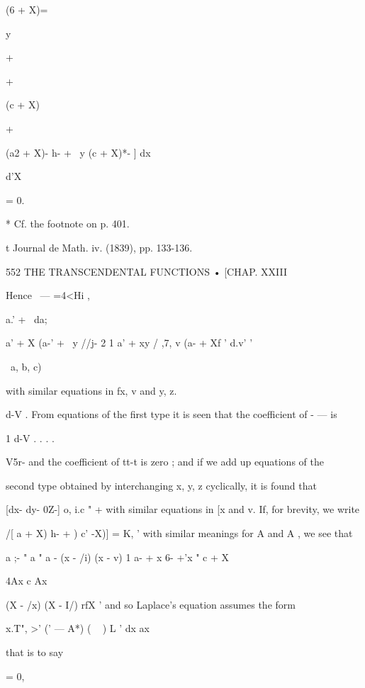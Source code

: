 {{{(6 + X)=

y



+



+



(c + X)



+



(a2 + X)- h- + \ y (c + X)*- ] dx



d'X



= 0.



* Cf. the footnote on p. 401.

t Journal de Math. iv. (1839), pp. 133-136.



552 THE TRANSCENDENTAL FUNCTIONS • [CHAP. XXIII

Hence ~— =4<Hi ,

a.' + \ da;

a' + X (a-' + \ y //j- 2 1 a' + xy / ,7, v (a- + Xf ' d.v' '

\ a, b, c)

with similar equations in fx, v and y, z.

d-V . From equations of the first type it is seen that the coefficient
of - — is

1 d-V . . . .

V5r- and the coefficient of tt-t is zero ; and if we add up equations
of the

second type obtained by interchanging x, y, z cyclically, it is found
that

[dx- dy- 0Z-] o, i.c " + with similar equations in [x and v. If, for
brevity, we write

 /[ a + X) h- + ) c' -X)] = K, ' with similar meanings for A and A ,
we see that

a ;- " a " a - (x - /i) (x - v) 1 a- + x 6- +'x " c + X

4Ax c Ax



(X - /x) (X - I/) rfX ' and so Laplace's equation assumes the form

x.T", >' (' — A*) ( ~ ) L ' dx ax

that is to say



= 0,



}}}
